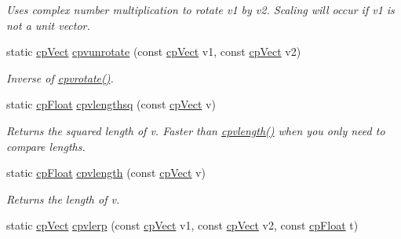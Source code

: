 \begin{DoxyCompactItemize}
\begin{DoxyCompactList}\small\item\em Uses complex number multiplication to rotate v1 by v2. Scaling will occur if v1 is not a unit vector. \end{DoxyCompactList}\item 
\hypertarget{group__cp_vect_gac2b1120be08ee9225eadede83f5e054b}{}static \hyperlink{structcp_vect}{cp\+Vect} \hyperlink{group__cp_vect_gac2b1120be08ee9225eadede83f5e054b}{cpvunrotate} (const \hyperlink{structcp_vect}{cp\+Vect} v1, const \hyperlink{structcp_vect}{cp\+Vect} v2)\label{group__cp_vect_gac2b1120be08ee9225eadede83f5e054b}

\begin{DoxyCompactList}\small\item\em Inverse of \hyperlink{group__cp_vect_gac9a0bb9221f9f2068a48985fa70b5226}{cpvrotate()}. \end{DoxyCompactList}\item 
\hypertarget{group__cp_vect_gadfad8e091ac399cdc377a9c475f7ef0d}{}static \hyperlink{group__basic_types_gac1ed65573e035bf892505768c852d8d3}{cp\+Float} \hyperlink{group__cp_vect_gadfad8e091ac399cdc377a9c475f7ef0d}{cpvlengthsq} (const \hyperlink{structcp_vect}{cp\+Vect} v)\label{group__cp_vect_gadfad8e091ac399cdc377a9c475f7ef0d}

\begin{DoxyCompactList}\small\item\em Returns the squared length of v. Faster than \hyperlink{group__cp_vect_ga9bfe76d8e3c69edb6af7b0d9a63001f9}{cpvlength()} when you only need to compare lengths. \end{DoxyCompactList}\item 
\hypertarget{group__cp_vect_ga9bfe76d8e3c69edb6af7b0d9a63001f9}{}static \hyperlink{group__basic_types_gac1ed65573e035bf892505768c852d8d3}{cp\+Float} \hyperlink{group__cp_vect_ga9bfe76d8e3c69edb6af7b0d9a63001f9}{cpvlength} (const \hyperlink{structcp_vect}{cp\+Vect} v)\label{group__cp_vect_ga9bfe76d8e3c69edb6af7b0d9a63001f9}

\begin{DoxyCompactList}\small\item\em Returns the length of v. \end{DoxyCompactList}\item 
\hypertarget{group__cp_vect_gab93f4924f5369c10782de6dba5ef38da}{}static \hyperlink{structcp_vect}{cp\+Vect} \hyperlink{group__cp_vect_gab93f4924f5369c10782de6dba5ef38da}{cpvlerp} (const \hyperlink{structcp_vect}{cp\+Vect} v1, const \hyperlink{structcp_vect}{cp\+Vect} v2, const \hyperlink{group__basic_types_gac1ed65573e035bf892505768c852d8d3}{cp\+Float} t)\label{group__cp_vect_gab93f4924f5369c10782de6dba5ef38da}


\end{DoxyCompactItemize}
